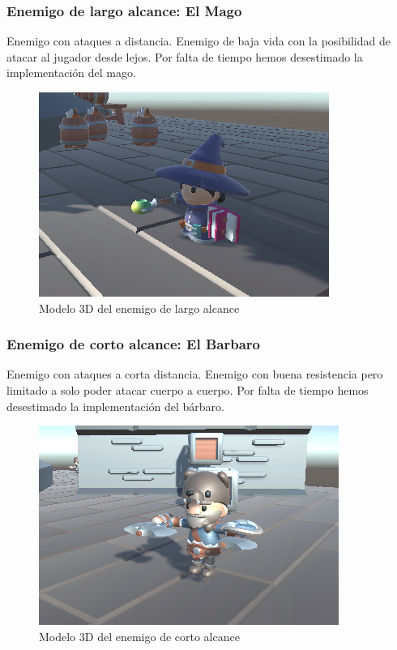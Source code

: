 \documentclass{article}
\begin{document}
\subsubsection{Enemigo de largo alcance: El Mago}
    Enemigo con ataques a distancia. 
    Enemigo de baja vida con la posibilidad de atacar al jugador desde lejos. 
    Por falta de tiempo hemos desestimado la implementación del mago.
    \begin{figure}[h!]
        \centering
        \includegraphics[width=.7\textwidth]{img/4.png}
        \caption{Modelo 3D del enemigo de largo alcance}
    \end{figure}

\subsubsection{Enemigo de corto alcance: El Barbaro}
    Enemigo con ataques a corta distancia. 
    Enemigo con buena resistencia pero limitado a solo poder atacar cuerpo a cuerpo. 
    Por falta de tiempo hemos desestimado la implementación del bárbaro.
    \begin{figure}[h!]
        \centering
        \includegraphics[width=.7\textwidth]{img/5.png}
        \caption{Modelo 3D del enemigo de corto alcance}
    \end{figure}
\end{document}
